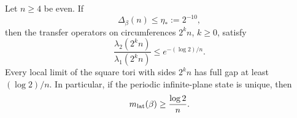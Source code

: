 \begin{samepage}
\begin{proposition}
\label{prop:criterion}
Let \(n\ge4\) be even. If
\begin{equation}
 \Delta_\beta(n)\le\eta_*:=2^{-10},
\label{eq:small-test}
\end{equation}
then the transfer operators on circumferences \(2^kn\), \(k\ge0\), satisfy
\begin{equation}
 \frac{\lambda_2(2^kn)}{\lambda_1(2^kn)}
 \le e^{-(\log2)/n}.
\label{eq:width-gap}
\end{equation}
Every local limit of the square tori with sides \(2^kn\) has full gap
at least \((\log2)/n\). In particular, if the periodic infinite-plane
state is unique, then
\begin{equation}
\label{eq:criterion-gap}
 m_{\mathrm{lat}}(\beta)\ge\frac{\log2}{n}.
\end{equation}
\end{proposition}
\end{samepage}

